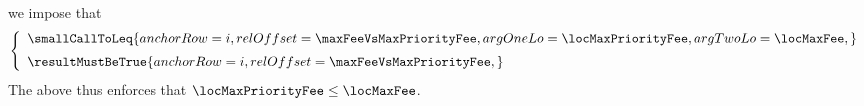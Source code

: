 \item[\underline{\underline{Row n$°(i + \maxFeeVsMaxPriorityFee)$: comparing \locMaxFee{} and \locMaxPriorityFee{}:}}]
	we impose that
	\[
		\left\{ \begin{array}{l}
			\smallCallToLeq {
				anchorRow = i                       ,
				relOffset = \maxFeeVsMaxPriorityFee ,
				argOneLo  = \locMaxPriorityFee      ,
				argTwoLo  = \locMaxFee              ,
			}
			\vspace{2mm}
			\\
			\resultMustBeTrue {
				anchorRow = i                       ,
				relOffset = \maxFeeVsMaxPriorityFee ,
			}
			\\
		\end{array} \right.
	\]
	\saNote{}
	The above thus enforces that
	$\locMaxPriorityFee \leq \locMaxFee$.
